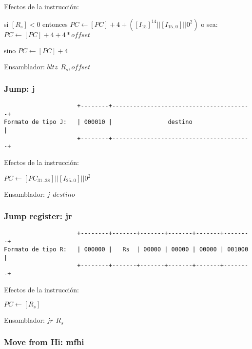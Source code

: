 \documentclass[letterpaper,11pt]{scrartcl}
\begin{document}
Efectos de la instrucción: 

si $[R_{s}] < 0$ entonces $PC \leftarrow [PC] + 4 + ( [I_{15}]^{14} || [I_{15..0}] || 0^{2} )$ o sea: $PC \leftarrow [PC] + 4 + 4*offset$

sino $PC \leftarrow [PC] + 4$

Ensamblador: $bltz\hspace{5pt}R_{s}, offset$


\subsubsection*{Jump: \textbf{j}}

\begin{verbatim}
                     +--------+----------------------------------------+ 
Formato de tipo J:   | 000010 |                destino                 | 
                     +--------+----------------------------------------+ 
\end{verbatim}

Efectos de la instrucción: 

$PC \leftarrow [PC_{31..28}] || [I_{25..0}] || 0^{2} $

Ensamblador: $j\hspace{5pt} destino$


\subsubsection*{Jump register: \textbf{jr}}

\begin{verbatim}
                     +--------+-------+-------+-------+-------+--------+ 
Formato de tipo R:   | 000000 |   Rs  | 00000 | 00000 | 00000 | 001000 | 
                     +--------+-------+-------+-------+-------+--------+ 
\end{verbatim}

Efectos de la instrucción: 

$PC \leftarrow [R_s]$

Ensamblador: $jr\hspace{5pt}R_{s}$


\subsubsection*{Move from Hi: \textbf{mfhi}}
\end{document}
